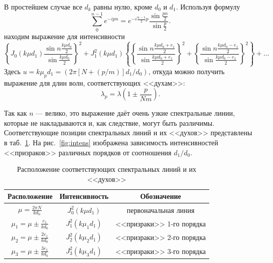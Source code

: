 \documentclass[a4paper, 12pt]{article}
\begin{document}
В простейшем случае все $d_k$ равны нулю, кроме $d_0$ и $d_1$. Используя формулу
\begin{equation} \label{eq:progr_sum}
\sum_0^{n - 1}{e^{-i p n}} = e^{-i \frac{n - 1}{2}p}{\frac{\sin{\frac{p n}{2}}}{\sin{\frac{p}{2}}}}.
\end{equation}
находим выражение для интенсивности
\begin{equation}\label{eq:intens}
\left\{ J_0(k \mu d_1) \frac{\sin{n\frac{k \mu d_0}{2}}}{\sin{\frac{k \mu d_0}{2}}}\right\}^2 + J_1^2(k \mu d_1) \left\{ \left\{ \frac{\sin{n \frac{k \mu d_0 + e_1}{2}}}{\sin{\frac{k \mu d_0 + e_1}{2}}} \right\}^2 + \left\{ \frac{\sin{n \frac{k \mu d_0 - e_1}{2}}}{\sin{\frac{k \mu d_0 - e_1}{2}}} \right\}^2 \right\} + \ldots
\end{equation}
Здесь $u = k \mu_p d_1 = (2 \pi[N + (p/m)] d_1 / d_0)$, откуда можно получить выражение для длин волн, соответствующих <<духам>>:
\begin{equation} \label{eq:new_wlen}
\lambda_p = \lambda \left(1 \pm \frac{p}{N m}\right).
\end{equation}

Так как $n$ --- велико, это выражение даёт очень узкие спектральные линии, которые не накладываются и, как следствие, могут быть различимы. Соответствующие позиции спектральных линий и их <<духов>> представлены в таб.~\ref{tab:ghosts_pos}. На рис.~\ref{fig:intens} изображена зависимость интенсивностей <<призраков>> различных порядков от соотношения $d_1/d_0$.

\begin{table}[h!]
\renewcommand{\arraystretch}{1.5}
\begin{center}
\begin{tabular}{|c|c|c|}
\hline 
Расположение & Интенсивность & Обозначение \\ 
\hline 
$\mu = \frac{2 \pi N}{k d_0} $ & $J_0^2(k \mu d_1)$ & первоначальная линия \\ 
\hline 
$\mu_1 = \mu \pm \frac{e_1}{k d_0}$ & $J_1^2(k \mu_1 d_1)$ & <<призраки>> 1-го порядка \\ 
\hline 
$\mu_2 = \mu \pm \frac{2 e_1}{k d_0}$ & $J_2^2(k \mu_2 d_1)$ & <<призраки>> 2-го порядка \\ 
\hline 
$\mu_3 = \mu \pm \frac{3 e_1}{k d_0}$ & $J_3^2(k \mu_3 d_1)$ & <<призраки>> 3-го порядка \\ 
\hline 
\end{tabular}
\end{center}
\caption{Расположение соответствующих спектральных линий и их <<духов>>}
\label{tab:ghosts_pos}
\end{table}
\end{document}
